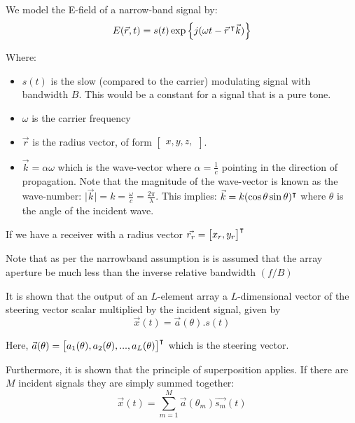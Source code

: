 We model the E-field of a narrow-band signal by:
\begin{equation}
  E(\vec{r}, t) = s(t) \exp \left\{ j(\omega t - \vec{r}\, ^\intercal \vec{k}) \right\}
\end{equation}

Where:
\begin{itemize}
  \item \(s(t)\) is the slow (compared to the carrier) modulating signal with bandwidth \(B\). This would be a constant for a signal that is a pure tone.
  \item \(\omega\) is the carrier frequency
  \item \( \vec{r} \) is the radius vector, of form \( \begin{bmatrix} x, y, z, \end{bmatrix} \).
  \item \(\vec{k} = \alpha\omega\) which is the wave-vector where \(\alpha = \frac{1}{c}\) pointing in the direction of propagation. Note that the magnitude of the wave-vector is known as the wave-number: \(\lvert \vec{k} \rvert = k = \frac{\omega}{c} = \frac{2\pi}{\lambda}\). This implies: \(\vec{k} = k(\cos\theta \sin\theta)^\intercal\) where \(\theta\) is the angle of the incident wave.
\end{itemize}

If we have a receiver with a radius vector \(\vec{r_r} = \begin{bmatrix} x_r, y_r \end{bmatrix}^\intercal\)

Note that as per the narrowband assumption is is assumed that the array aperture be much less than the inverse relative bandwidth \((f/B)\)

It is shown that the output of an \(L\)-element array a \(L\)-dimensional vector of the steering vector scalar multiplied by the incident signal, given by
\begin{equation}
  \vec{x}(t) = \vec{a}(\theta).s(t)
\end{equation}

Here, \(\vec{a}(\theta) = \begin{bmatrix} a_1(\theta), a_2(\theta), ... , a_L(\theta) \end{bmatrix}^\intercal\) which is the steering vector.

  Furthermore, it is shown that the principle of superposition applies. If there are \(M\) incident signals they are simply summed together:
\begin{equation}
  \vec{x}(t) = \sum_{m=1}^{M} \vec{a}(\theta_m)\vec{s_m}(t)
\end{equation}

